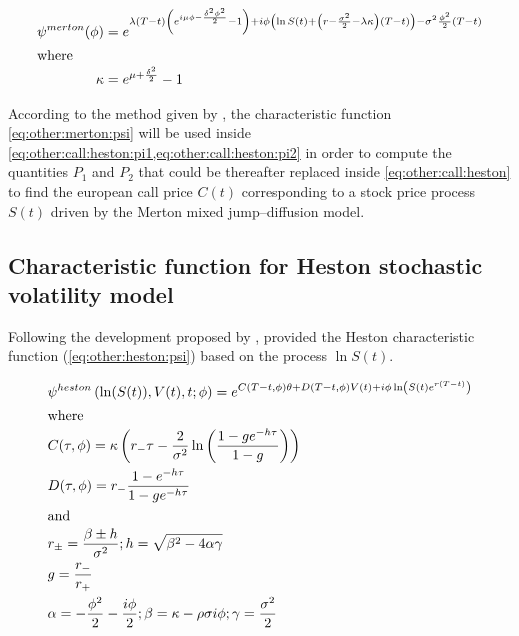 \documentclass[a4paper, 12pt]{report}
\begin{document}
\begin{align}
\psi^{merton}(\phi) &= e^{ 
  \lambda (T - t) \left( e^{i \mu \phi - \frac{\delta^2 \phi^2}{2}} - 1\right) +
  i \phi \left( \ln S(t) + \left(  r - \frac{\sigma^2}{2} - \lambda \kappa \right) (T - t) \right) -
  \sigma^2 \frac{\phi^2}{2} (T - t)
}
\label{eq:other:merton:psi} \\
\intertext{where}
\kappa &= e^{\mu + \frac{\delta^2}{2}} - 1 \notag \\
\end{align}
  
According to the method given by \citet{heston1993}, the characteristic function \ref{eq:other:merton:psi} will be used inside \cref{eq:other:call:heston:pi1,eq:other:call:heston:pi2} in order to compute the quantities $P_1$ and $P_2$ that could be thereafter replaced inside \cref{eq:other:call:heston} to find the european call price  $C(t)$ corresponding to a stock price process $S(t)$ driven by the Merton mixed jump--diffusion model.



\subsection{Characteristic function for Heston stochastic volatility model}
\label{sub:other:option:heston}

Following the development proposed by \citet{gatheral2006}, \citet{criso2015} provided the Heston characteristic function (\cref{eq:other:heston:psi}) based on the process $\ln S(t)$.

\begin{align}
  &\psi^{heston}\left(\ln(S(t)),V(t),t;\phi\right) = e^{C(T-t, \phi)\theta + D(T-t, \phi)V(t) + i\phi\ln\left(S(t)e^{r(T-t)}\right)} \label{eq:other:heston:psi} \\
  \intertext{where}
  &C(\tau, \phi) = \kappa \left(r_{-} \tau - \frac{2}{\sigma^2}\ln\left(\frac{1 - g e^{-h\tau}}{1 - g}\right)\right) \notag \\
  &D(\tau, \phi) = r_{-}\frac{1 - e^{-h\tau}}{1 - ge^{-h\tau}} \notag \\ 
  \intertext{and}
  &r_{\pm} = \frac{\beta \pm h}{\sigma^2}; h = \sqrt{\beta^2 - 4\alpha\gamma} \notag \\
  &g = \frac{r_{-}}{r_{+}} \notag \\
  &\alpha = -\frac{\phi^2}{2} - \frac{i\phi}{2}; \beta = \kappa - \rho\sigma i\phi; \gamma = \frac{\sigma^2}{2} \notag
\end{align}
\end{document}
